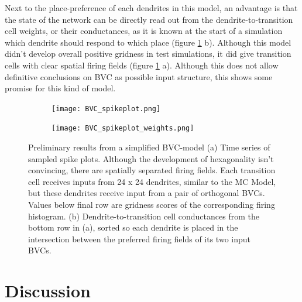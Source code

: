 \documentclass{article}
\begin{document}
    Next to the place-preference of each dendrites in this model, an advantage is that the state of the network can be directly read out from the dendrite-to-transition cell weights, or their conductances, as it is known at the start of a simulation which dendrite should respond to which place (figure \ref{BVC_spikeplot} b). Although this model didn't develop overall positive gridness in test simulations, it did give transition cells with clear spatial firing fields (figure \ref{BVC_spikeplot} a). Although this does not allow definitive conclusions on BVC as possible input structure, this shows some promise for this kind of model. 

    \begin{figure}[H]
        \begin{subfigure}{\textwidth}
            \subcaption{}
            \texttt{[image: BVC\_spikeplot.png]}
        \end{subfigure}
        \begin{subfigure}{\textwidth}
            \subcaption{}
            \hspace*{0.01\linewidth}
            \texttt{[image: BVC\_spikeplot\_weights.png]}
        \end{subfigure}

        \caption{Preliminary results from a simplified BVC-model (a) Time series of sampled spike plots. Although the development of hexagonality isn't convincing, there are spatially separated firing fields. Each transition cell receives inputs from 24 x 24 dendrites, similar to the MC Model, but these dendrites receive input from a pair of orthogonal BVCs. Values below final row are gridness scores of the corresponding firing histogram. (b) Dendrite-to-transition cell conductances from the bottom row in (a), sorted so each dendrite is placed in the intersection between the preferred firing fields of its two input BVCs.}
        \label{BVC_spikeplot}
    \end{figure}

    

    \section{Discussion} \label{Discussion}
\end{document}
